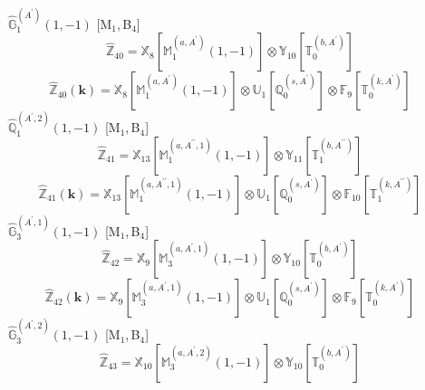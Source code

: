 \documentclass[fleqn,10pt,landscape]{article}
\begin{document}
\begin{itemize}
\begin{dmath*}
\end{dmath*}
\vspace{4mm}
\noindent {} $\,\,\,\hat{\mathbb{G}}_{1}^{(A^{\prime})}(1,-1)$ [M$_{1}$,\,B$_{4}$]
\begin{dmath*}
\hat{\mathbb{Z}}_{40}=\mathbb{X}_{8}[\mathbb{M}_{1}^{(a,A^{\prime})}(1,-1)] \otimes\mathbb{Y}_{10}[\mathbb{T}_{0}^{(b,A^{\prime})}]
\end{dmath*}
\begin{dmath*}
\hat{\mathbb{Z}}_{40}(\bm{k})=\mathbb{X}_{8}[\mathbb{M}_{1}^{(a,A^{\prime})}(1,-1)] \otimes\mathbb{U}_{1}[\mathbb{Q}_{0}^{(s,A^{\prime})}] \otimes\mathbb{F}_{9}[\mathbb{T}_{0}^{(k,A^{\prime})}]
\end{dmath*}
\vspace{4mm}
\noindent {} $\,\,\,\hat{\mathbb{Q}}_{1}^{(A^{\prime},2)}(1,-1)$ [M$_{1}$,\,B$_{4}$]
\begin{dmath*}
\hat{\mathbb{Z}}_{41}=\mathbb{X}_{13}[\mathbb{M}_{1}^{(a,A^{\prime\prime},1)}(1,-1)] \otimes\mathbb{Y}_{11}[\mathbb{T}_{1}^{(b,A^{\prime\prime})}]
\end{dmath*}
\begin{dmath*}
\hat{\mathbb{Z}}_{41}(\bm{k})=\mathbb{X}_{13}[\mathbb{M}_{1}^{(a,A^{\prime\prime},1)}(1,-1)] \otimes\mathbb{U}_{1}[\mathbb{Q}_{0}^{(s,A^{\prime})}] \otimes\mathbb{F}_{10}[\mathbb{T}_{1}^{(k,A^{\prime\prime})}]
\end{dmath*}
\vspace{4mm}
\noindent {} $\,\,\,\hat{\mathbb{G}}_{3}^{(A^{\prime},1)}(1,-1)$ [M$_{1}$,\,B$_{4}$]
\begin{dmath*}
\hat{\mathbb{Z}}_{42}=\mathbb{X}_{9}[\mathbb{M}_{3}^{(a,A^{\prime},1)}(1,-1)] \otimes\mathbb{Y}_{10}[\mathbb{T}_{0}^{(b,A^{\prime})}]
\end{dmath*}
\begin{dmath*}
\hat{\mathbb{Z}}_{42}(\bm{k})=\mathbb{X}_{9}[\mathbb{M}_{3}^{(a,A^{\prime},1)}(1,-1)] \otimes\mathbb{U}_{1}[\mathbb{Q}_{0}^{(s,A^{\prime})}] \otimes\mathbb{F}_{9}[\mathbb{T}_{0}^{(k,A^{\prime})}]
\end{dmath*}
\vspace{4mm}
\noindent {} $\,\,\,\hat{\mathbb{G}}_{3}^{(A^{\prime},2)}(1,-1)$ [M$_{1}$,\,B$_{4}$]
\begin{dmath*}
\hat{\mathbb{Z}}_{43}=\mathbb{X}_{10}[\mathbb{M}_{3}^{(a,A^{\prime},2)}(1,-1)] \otimes\mathbb{Y}_{10}[\mathbb{T}_{0}^{(b,A^{\prime})}]
\end{dmath*}
\begin{dmath*}

\end{dmath*}
\end{itemize}
\end{document}
